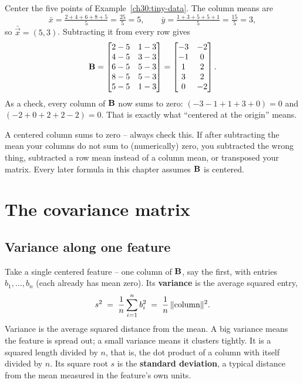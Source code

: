 \begin{example}\label{ch30:center-it}
Center the five points of Example~\ref{ch30:tiny-data}. The column means are
\[
  \bar x = \tfrac{2+4+6+8+5}{5} = \tfrac{25}{5} = 5,
  \qquad
  \bar y = \tfrac{1+3+5+5+1}{5} = \tfrac{15}{5} = 3,
\]
so $\bar{\vec x}=(5,3)$. Subtracting it from every row gives
\[
  \mathbf{B} =
  \begin{bmatrix}
    2-5 & 1-3\\
    4-5 & 3-3\\
    6-5 & 5-3\\
    8-5 & 5-3\\
    5-5 & 1-3
  \end{bmatrix}
  =
  \begin{bmatrix}
    -3 & -2\\
    -1 & 0\\
    1 & 2\\
    3 & 2\\
    0 & -2
  \end{bmatrix}.
\]
As a check, every column of $\mathbf{B}$ now sums to zero: $(-3-1+1+3+0)=0$ and
$(-2+0+2+2-2)=0$. That is exactly what ``centered at the origin'' means.
\end{example}

\begin{trapbox}
A centered column sums to zero -- always check this. If after subtracting the mean
your columns do not sum to (numerically) zero, you subtracted the wrong thing,
subtracted a row mean instead of a column mean, or transposed your matrix. Every
later formula in this chapter assumes $\mathbf{B}$ is centered.
\end{trapbox}

\section{The covariance matrix}
\label{ch30:sec-cov}

\subsection{Variance along one feature}

Take a single centered feature -- one column of $\mathbf{B}$, say the first, with
entries $b_1,\dots,b_n$ (each already has mean zero). Its \textbf{variance} is the
average squared entry,
\[
  s^2 \;=\; \frac{1}{n}\sum_{i=1}^{n} b_i^2
  \;=\; \frac{1}{n}\,\lVert\text{column}\rVert^2.
\]
Variance is the average squared distance from the mean. A big variance means
the feature is spread out; a small variance means it clusters tightly. It is
a squared length divided by $n$, that is, the dot product of a column with itself
divided by $n$. Its square root $s$ is the \textbf{standard deviation}, a typical
distance from the mean measured in the feature's own units.

